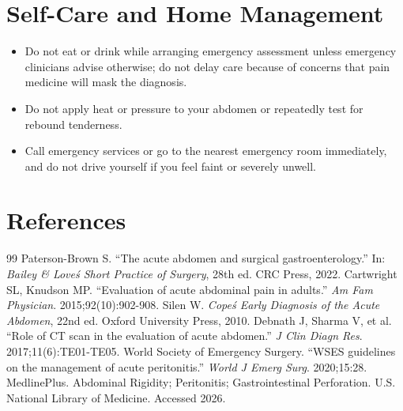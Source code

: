 \section*{Self-Care and Home Management}
\begin{itemize}
  \item Do not eat or drink while arranging emergency assessment unless emergency clinicians advise otherwise; do not delay care because of concerns that pain medicine will mask the diagnosis.
  \item Do not apply heat or pressure to your abdomen or repeatedly test for rebound tenderness.
  \item Call emergency services or go to the nearest emergency room immediately, and do not drive yourself if you feel faint or severely unwell.
\end{itemize}

\section*{References}
\begin{thebibliography}{99}
 Paterson-Brown S. ``The acute abdomen and surgical gastroenterology.'' In: \textit{Bailey \& Love\'s Short Practice of Surgery}, 28th ed. CRC Press, 2022.
 Cartwright SL, Knudson MP. ``Evaluation of acute abdominal pain in adults.'' \textit{Am Fam Physician}. 2015;92(10):902-908.
 Silen W. \textit{Cope\'s Early Diagnosis of the Acute Abdomen}, 22nd ed. Oxford University Press, 2010.
 Debnath J, Sharma V, et al. ``Role of CT scan in the evaluation of acute abdomen.'' \textit{J Clin Diagn Res}. 2017;11(6):TE01-TE05.
 World Society of Emergency Surgery. ``WSES guidelines on the management of acute peritonitis.'' \textit{World J Emerg Surg}. 2020;15:28.
 MedlinePlus. Abdominal Rigidity; Peritonitis; Gastrointestinal Perforation. U.S. National Library of Medicine. Accessed 2026.
\end{thebibliography}
